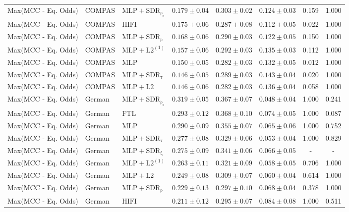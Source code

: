 \begin{table}[htbp]
\begin{tabular}{lllccccc}
Max(MCC - Eq. Odds) & COMPAS & $\mathrm{MLP+SDR_{\rho_s}}$ & $0.179 \pm0.04$ & $0.303 \pm0.02$ & $0.124 \pm0.03$ & 0.159 & 1.000 \\
Max(MCC - Eq. Odds) & COMPAS & $\mathrm{HIFI}$ & $0.175 \pm0.06$ & $0.287 \pm0.08$ & $0.112 \pm0.05$ & 0.022 & 1.000 \\
Max(MCC - Eq. Odds) & COMPAS & $\mathrm{MLP+SDR_{\rho}}$ & $0.168 \pm0.06$ & $0.290 \pm0.03$ & $0.122 \pm0.05$ & 0.150 & 1.000 \\
Max(MCC - Eq. Odds) & COMPAS & $\mathrm{MLP+L2^{(1)}}$ & $0.157 \pm0.06$ & $0.292 \pm0.03$ & $0.135 \pm0.03$ & 0.112 & 1.000 \\
Max(MCC - Eq. Odds) & COMPAS & $\mathrm{MLP}$ & $0.150 \pm0.05$ & $0.282 \pm0.03$ & $0.132 \pm0.05$ & 0.012 & 1.000 \\
Max(MCC - Eq. Odds) & COMPAS & $\mathrm{MLP+SDR_{\tau}}$ & $0.146 \pm0.05$ & $0.289 \pm0.03$ & $0.143 \pm0.04$ & 0.020 & 1.000 \\
Max(MCC - Eq. Odds) & COMPAS & $\mathrm{MLP+L2}$ & $0.146 \pm0.06$ & $0.282 \pm0.03$ & $0.136 \pm0.04$ & 0.058 & 1.000 \\
Max(MCC - Eq. Odds) & German & $\mathrm{MLP+SDR_{\rho_s}}$ & $0.319 \pm0.05$ & $0.367 \pm0.07$ & $0.048 \pm0.04$ & 1.000 & 0.241 \\
Max(MCC - Eq. Odds) & German & $\mathrm{FTL}$ & $0.293 \pm0.12$ & $0.368 \pm0.10$ & $0.074 \pm0.05$ & 1.000 & 0.087 \\
Max(MCC - Eq. Odds) & German & $\mathrm{MLP}$ & $0.290 \pm0.09$ & $0.355 \pm0.07$ & $0.065 \pm0.06$ & 1.000 & 0.752 \\
Max(MCC - Eq. Odds) & German & $\mathrm{MLP+SDR_{\tau}}$ & $0.277 \pm0.08$ & $0.329 \pm0.06$ & $0.053 \pm0.04$ & 1.000 & 0.829 \\
Max(MCC - Eq. Odds) & German & $\mathrm{MLP+SDR_{\xi}}$ & $0.275 \pm0.09$ & $0.341 \pm0.06$ & $0.066 \pm0.05$ & - & - \\
Max(MCC - Eq. Odds) & German & $\mathrm{MLP+L2^{(1)}}$ & $0.263 \pm0.11$ & $0.321 \pm0.09$ & $0.058 \pm0.05$ & 0.706 & 1.000 \\
Max(MCC - Eq. Odds) & German & $\mathrm{MLP+L2}$ & $0.249 \pm0.08$ & $0.309 \pm0.07$ & $0.060 \pm0.04$ & 0.614 & 1.000 \\
Max(MCC - Eq. Odds) & German & $\mathrm{MLP+SDR_{\rho}}$ & $0.229 \pm0.13$ & $0.297 \pm0.10$ & $0.068 \pm0.04$ & 0.378 & 1.000 \\
Max(MCC - Eq. Odds) & German & $\mathrm{HIFI}$ & $0.211 \pm0.12$ & $0.295 \pm0.07$ & $0.084 \pm0.08$ & 1.000 & 0.511 \\

\end{tabular}
\end{table}
